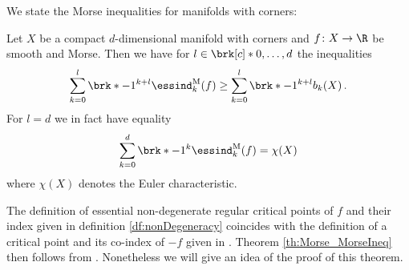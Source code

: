 We state the Morse inequalities for manifolds with corners:
\begin{theorem}
  \label{th:Morse_MorseIneq}
  Let $X$ be a compact $d$-dimensional manifold with corners and $f\colon X\to\R$ be smooth and Morse.
  Then we have for $l\in\brk[c]*{0,\dots,d}$ the inequalities
  \begin{align}
    \sum_{k=0}^l \brk*{-1}^{k+l}\essind_k^\text{M}(f)\geq \sum_{k=0}^l\brk*{-1}^{k+l}b_k(X)\,.
    \label{eq:MorseIneq_inequality}
  \end{align}
  For $l=d$ we in fact have equality
  \begin{align}
    \sum_{k=0}^d \brk*{-1}^{k}\essind_k^\text{M}(f)= \chi(X)\label{eq:MorseIneq_equality}
  \end{align}
  where $\chi(X)$ denotes the Euler characteristic.
\end{theorem}
  The definition of essential non-degenerate regular critical points of $f$ and their index given in definition \ref{df:nonDegeneracy} coincides with 
  the definition of a critical point and its co-index of $-f$ given in \cite{Agrach1991}.
  Theorem \ref{th:Morse_MorseIneq} then follows from \cite[Theorem 2.4]{Agrach1991}.
  Nonetheless we will give an idea of the proof of this theorem.

